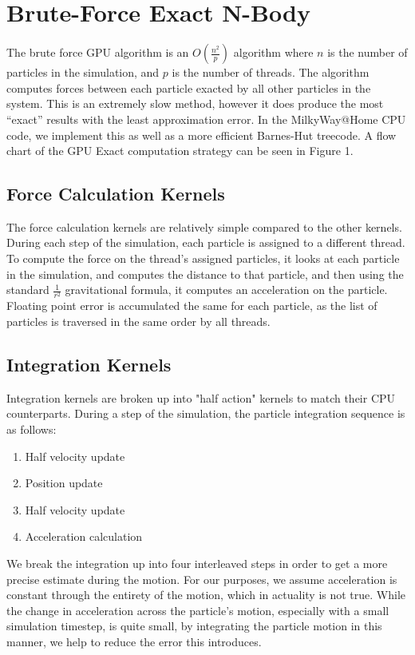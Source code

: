\documentclass[fleqn,10pt]{SelfArx} %
\begin{document}

\section{Brute-Force Exact N-Body}
The brute force GPU algorithm is an $O\left(\frac{n^2}{p}\right)$ algorithm where $n$ is the number of particles in the simulation, and $p$ is the number of threads. The algorithm computes forces between each particle exacted by all other particles in the system. This is an extremely slow method, however it does produce the most “exact” results with the least approximation error. In the MilkyWay@Home CPU code, we implement this as well as a more efficient Barnes-Hut treecode. A flow chart of the GPU Exact computation strategy can be seen in Figure 1.

\subsection{Force Calculation Kernels}
The force calculation kernels are relatively simple compared to the other kernels. During each step of the simulation, each particle is assigned to a different thread. To compute the force on the thread's assigned particles, it looks at each particle in the simulation, and computes the distance to that particle, and then using the standard $\frac{1}{r^2}$ gravitational formula, it computes an acceleration on the particle. Floating point error is accumulated the same for each particle, as the list of particles is traversed in the same order by all threads.

\subsection{Integration Kernels}
Integration kernels are broken up into "half action" kernels to match their CPU counterparts. During a step of the simulation, the particle integration sequence is as follows:
\begin{enumerate}
    \setlength\itemsep{0.1pt}
    \item Half velocity update
    \item Position update
    \item Half velocity update
    \item Acceleration calculation
\end{enumerate}
We break the integration up into four interleaved steps in order to get a more precise estimate during the motion. For our purposes, we assume acceleration is constant through the entirety of the motion, which in actuality is not true. While the change in acceleration across the particle's motion, especially with a small simulation timestep, is quite small, by integrating the particle motion in this manner, we help to reduce the error this introduces.
\end{document}

